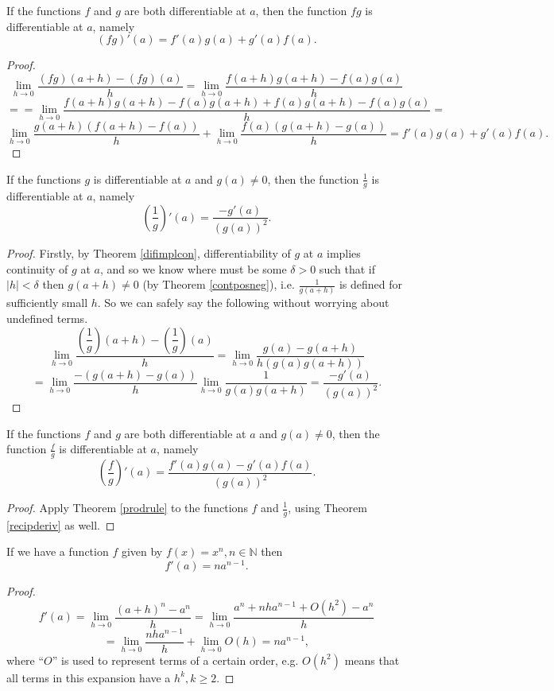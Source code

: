 \begin{theorem} \label{prodrule}
If the functions $f$ and $g$ are both differentiable at $a$, then the function $fg$ is differentiable at $a$, namely
\[ (fg)'(a) = f'(a)g(a) + g'(a)f(a). \]

\begin{proof}
\[ \lim_{h \to 0} \frac{(fg)(a+h)-(fg)(a)}{h} = \lim_{h \to 0} \frac{f(a+h)g(a+h)-f(a)g(a)}{h} \]
\[ = = \lim_{h \to 0} \frac{f(a+h)g(a+h)-f(a)g(a+h)+f(a)g(a+h)-f(a)g(a)}{h} = \] 
\[ \lim_{h \to 0} \frac{g(a+h)(f(a+h) - f(a))}{h} + \lim_{h \to 0} \frac{f(a)(g(a+h)-g(a))}{h} = f'(a)g(a) + g'(a)f(a). \]
\end{proof}
\end{theorem}

\begin{theorem} \label{recipderiv}
If the functions $g$ is differentiable at $a$ and $g(a) \ne 0$, then the function $\frac 1g$ is differentiable at $a$, namely
\[ \left(\frac 1g\right)'(a) = \frac{-g'(a)}{(g(a))^2}. \]

\begin{proof}
Firstly, by Theorem \ref{difimplcon}, differentiability of $g$ at $a$ implies continuity of $g$ at $a$, and so we know where must be some $\delta > 0$ such that if $|h| < \delta$ then $g(a+h) \ne 0$ (by Theorem \ref{contposneg}), i.e. $\frac 1{g(a+h)}$ is defined for sufficiently small $h$. So we can safely say the following without worrying about undefined terms.
\[ \lim_{h \to 0} \frac{\left(\dfrac 1g\right)(a + h) - \left(\dfrac 1g\right)(a)}{h} = \lim_{h \to 0} \frac{g(a) - g(a+h)}{h(g(a)g(a+h))} \]
\[ = \lim_{h \to 0} \frac{-(g(a+h)-g(a))}{h} \lim_{h \to 0}\frac 1{g(a)g(a+h)} = \frac{-g'(a)}{(g(a))^2}. \]
\end{proof} 
\end{theorem}

\begin{theorem}
If the functions $f$ and $g$ are both differentiable at $a$ and $g(a) \ne 0$, then the function $\frac fg$ is differentiable at $a$, namely
\[ \left(\frac fg\right)'(a) = \frac{f'(a)g(a)-g'(a)f(a)}{(g(a))^2}. \]

\begin{proof}
Apply Theorem \ref{prodrule} to the functions $f$ and $\frac{1}{g}$, using Theorem \ref{recipderiv} as well.
\end{proof}
\end{theorem}

\begin{theorem}
If we have a function $f$ given by $f(x) = x^n, n \in \mathbb{N}$ then
\[ f'(a) = na^{n-1}. \]

\begin{proof}
\[ f'(a) = \lim_{h \to 0} \frac{(a+h)^n - a^n}{h} = \lim_{h \to 0} \frac{a^n + nha^{n-1} + O(h^2) - a^n}{h} \]
\[ = \lim_{h \to 0} \frac{nha^{n-1}}{h} + \lim_{h \to 0} O(h) = na^{n-1}, \]
where ``$O$'' is used to represent terms of a certain order, e.g. $O(h^2)$ means that all terms in this expansion have a $h^k, k \ge 2$.
\end{proof}
\end{theorem}


